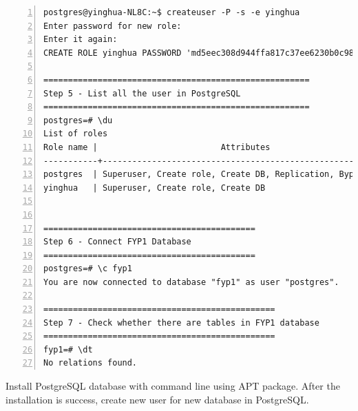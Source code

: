 \begin{lstlisting}[breaklines, frame=single, numbers=left, caption={Linux command for PostgreSQL database installation}, label=commandline-02]
postgres@yinghua-NL8C:~$ createuser -P -s -e yinghua
Enter password for new role: 
Enter it again: 
CREATE ROLE yinghua PASSWORD 'md5eec308d944ffa817c37ee6230b0c98eb' SUPERUSER CREATEDB CREATEROLE INHERIT LOGIN;

======================================================
Step 5 - List all the user in PostgreSQL
======================================================
postgres=# \du
List of roles
Role name |                         Attributes                         | Member of 
-----------+------------------------------------------------------------+-----------
postgres  | Superuser, Create role, Create DB, Replication, Bypass RLS | {}
yinghua   | Superuser, Create role, Create DB   


===========================================
Step 6 - Connect FYP1 Database
===========================================
postgres=# \c fyp1
You are now connected to database "fyp1" as user "postgres".

===============================================
Step 7 - Check whether there are tables in FYP1 database
===============================================
fyp1=# \dt
No relations found.

\end{lstlisting}

Install PostgreSQL database with command line using APT package. After the installation is success, create new user for new database in PostgreSQL. 


	
 








